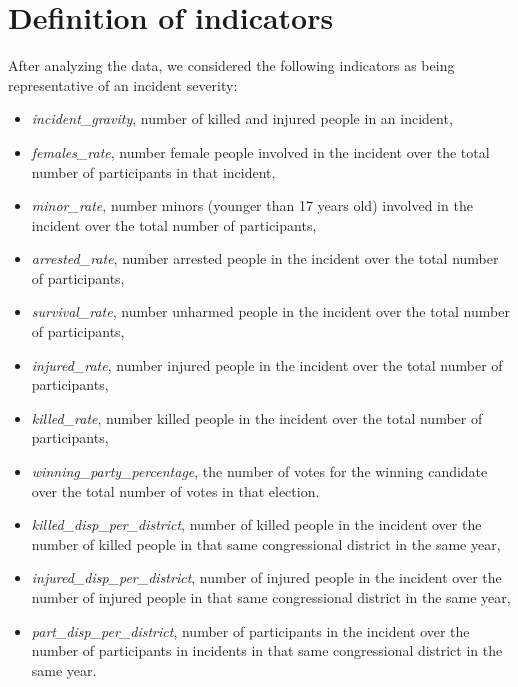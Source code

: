 \documentclass[10pt,a4paper]{report}
\begin{document}
\section{Definition of indicators}

After analyzing the data, we considered the following indicators as being representative of an incident severity:
\begin{itemize}
	\item \textit{incident\_gravity}, number of killed and injured people in an incident,
	\item \textit{females\_rate}, number female people involved in the incident over the total number of participants in that incident,
	\item \textit{minor\_rate}, number minors (younger than 17 years old) involved in the incident over the total number of participants,
	\item \textit{arrested\_rate}, number arrested people in the incident over the total number of participants,
	\item \textit{survival\_rate}, number unharmed people in the incident over the total number of participants,
	\item \textit{injured\_rate}, number injured people in the incident over the total number of participants,
	\item \textit{killed\_rate}, number killed people in the incident over the total number of participants,
	\item \textit{winning\_party\_percentage}, the number of votes for the winning candidate over the total number of votes in that election.
	\item \textit{killed\_disp\_per\_district}, number of killed people in the incident over the number of killed people in that same congressional district in the same year,
	\item \textit{injured\_disp\_per\_district}, number of injured people in the incident over the number of injured people in that same congressional district in the same year,
	\item \textit{part\_disp\_per\_district}, number of participants in the incident over the number of participants in incidents in that same congressional district in the same year.
\end{itemize}
\end{document}

